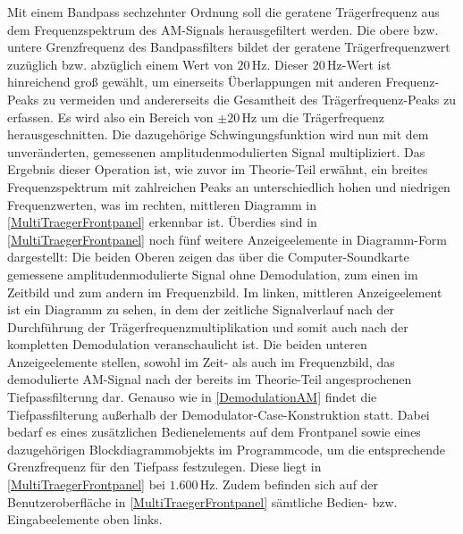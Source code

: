 \documentclass[
a4paper,
12pt,
pagesize,
ngerman
]{scrartcl}
\begin{document}
	\noindent Mit einem Bandpass sechzehnter Ordnung soll die geratene Trägerfrequenz aus dem Frequenzspektrum des AM-Signals herausgefiltert werden. 
	Die obere bzw. untere Grenzfrequenz des Bandpassfilters bildet der geratene Trägerfrequenzwert zuzüglich bzw. abzüglich einem Wert von $20\,$Hz. 
	Dieser $20\,$Hz-Wert ist hinreichend groß gewählt, um einerseits Überlappungen mit anderen Frequenz-Peaks zu vermeiden und andererseits die Gesamtheit des Trägerfrequenz-Peaks zu erfassen. 
	Es wird also ein Bereich von $\pm 20\,$Hz um die Trägerfrequenz \glqq herausgeschnitten\glqq . 
	Die dazugehörige Schwingungsfunktion wird nun mit dem unveränderten, gemessenen amplitudenmodulierten Signal multipliziert. 
	Das Ergebnis dieser Operation ist, wie zuvor im Theorie-Teil erwähnt, ein breites Frequenzspektrum mit zahlreichen Peaks an unterschiedlich hohen und niedrigen Frequenzwerten, was im rechten, mittleren Diagramm in \cref{MultiTraegerFrontpanel} erkennbar ist. 
	Überdies sind in \cref{MultiTraegerFrontpanel} noch fünf weitere Anzeigeelemente in Diagramm-Form dargestellt: Die beiden Oberen zeigen das über die Computer-Soundkarte gemessene amplitudenmodulierte Signal ohne Demodulation, zum einen im Zeitbild und zum andern im Frequenzbild. 
	Im linken, mittleren Anzeigeelement ist ein Diagramm zu sehen, in dem der zeitliche Signalverlauf nach der Durchführung der Trägerfrequenzmultiplikation und somit auch nach der kompletten Demodulation veranschaulicht ist. 
	Die beiden unteren Anzeigeelemente stellen, sowohl im Zeit- als auch im Frequenzbild, das demodulierte AM-Signal nach der bereits im Theorie-Teil angesprochenen Tiefpassfilterung dar. 
	Genauso wie in \cref{DemodulationAM} findet die Tiefpassfilterung außerhalb der Demodulator-Case-Konstruktion statt. 
	Dabei bedarf es eines zusätzlichen Bedienelements auf dem Frontpanel sowie eines dazugehörigen Blockdiagrammobjekts im Programmcode, um die entsprechende Grenzfrequenz für den Tiefpass festzulegen. 
	Diese liegt in \cref{MultiTraegerFrontpanel} bei $1.600\,$Hz. 
	Zudem befinden sich auf der Benutzeroberfläche in \cref{MultiTraegerFrontpanel} sämtliche Bedien- bzw. Eingabeelemente oben links.
	
\end{document}
